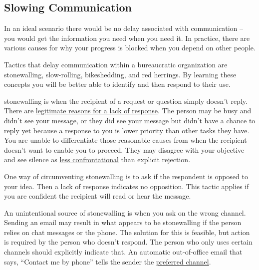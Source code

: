 \subsection*{Slowing Communication\label{sec:slowing-communication}}

In an ideal scenario there would be no delay associated with communication -- you would get the information you need when you need it. In practice, there are various causes for why your progress is blocked when you depend on other people. 

Tactics that delay communication within a bureaucratic organization are stonewalling, slow-rolling, bikeshedding, and red herrings. By learning these concepts you will be better able to identify and then respond to their use.

\Gls{stonewalling} 
is when the recipient of a request or question simply doesn't reply. There are \hyperref[sec:email-responsiveness]{legitimate reasons for a lack of response}. 
The person may be busy and didn't see your message, or they did see your message but didn't have a chance to reply yet because a response to you is lower priority than other tasks they have. You are unable to differentiate those reasonable causes from when the recipient doesn't want to enable you to proceed. They may disagree with your objective and see silence as \href{https://en.wikipedia.org/wiki/Passive-aggressive_behavior}{less confrontational}
than explicit rejection. 

One way of circumventing stonewalling is to ask if the respondent is opposed to your idea. 
Then a lack of response indicates no opposition. This tactic applies if you are confident the recipient will read or hear the message.

An unintentional source of stonewalling is when you ask on the wrong channel. Sending an email may result in what appears to be stonewalling if the person relies on chat messages or the phone. The solution for this 
is feasible, but action is required by the person who doesn't respond. The person who only uses certain channels should explicitly indicate that. An automatic out-of-office email that says, ``Contact me by phone'' tells the sender the \hyperref[sec:communication-preferences]{preferred channel}. 

